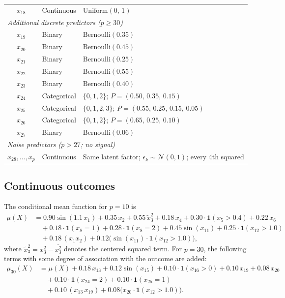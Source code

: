 \documentclass[11pt]{article}
\theoremstyle{plain}
\theoremstyle{definition}
\theoremstyle{remark}
\begin{document}
\begin{table}[ht!]
\begin{tabular}{cll}
		$x_{18}$ & Continuous   & $\mathrm{Uniform}(0,\, 1)$ \\[4pt]
		\multicolumn{3}{l}{\textit{Additional discrete predictors ($p \geq 30$)}} \\[2pt]
		$x_{19}$ & Binary       & $\mathrm{Bernoulli}(0.35)$ \\
		$x_{20}$ & Binary       & $\mathrm{Bernoulli}(0.45)$ \\
		$x_{21}$ & Binary       & $\mathrm{Bernoulli}(0.25)$ \\
		$x_{22}$ & Binary       & $\mathrm{Bernoulli}(0.55)$ \\
		$x_{23}$ & Binary       & $\mathrm{Bernoulli}(0.40)$ \\
		$x_{24}$ & Categorical  & $\{0,1,2\}$;\; $P = (0.50,\, 0.35,\, 0.15)$ \\
		$x_{25}$ & Categorical  & $\{0,1,2,3\}$;\; $P = (0.55,\, 0.25,\, 0.15,\, 0.05)$ \\
		$x_{26}$ & Categorical  & $\{0,1,2\}$;\; $P = (0.65,\, 0.25,\, 0.10)$ \\
		$x_{27}$ & Binary       & $\mathrm{Bernoulli}(0.06)$ \\[4pt]
		\multicolumn{3}{l}{\textit{Noise predictors ($p > 27$; no signal)}} \\[2pt]
		$x_{28}, \ldots, x_p$ & Continuous & Same latent factor; $\epsilon_k \sim \mathcal{N}(0,1)$; every 4th squared \\
		\hline
	\end{tabular}
\end{table}

\subsection*{Continuous outcomes}

The conditional mean function for $p = 10$ is
\begin{align*}
	\mu(X) &= 0.90\sin(1.1\,x_1) + 0.35\,x_2 + 0.55\,\tilde{x}_3^2 + 0.18\,x_4 + 0.30\cdot\mathbf{1}(x_5 > 0.4) + 0.22\,x_6 \\
	&\quad + 0.18\cdot\mathbf{1}(x_8{=}1) + 0.28\cdot\mathbf{1}(x_8{=}2) + 0.45\sin(x_{11}) + 0.25\cdot\mathbf{1}(x_{12} > 1.0) \\
	&\quad + 0.18\,(x_1 x_2) + 0.12\bigl(\sin(x_{11})\cdot\mathbf{1}(x_{12} > 1.0)\bigr),
\end{align*}
where $\tilde{x}_3^2 = x_3^2 - \overline{x_3^2}$ denotes the centered squared term. For $p = 30$, the following terms with some degree of association with the outcome are added:
\begin{align*}
	\mu_{30}(X) &= \mu(X) + 0.18\,x_{13} + 0.12\sin(x_{15}) + 0.10\cdot\mathbf{1}(x_{16} > 0) + 0.10\,x_{19} + 0.08\,x_{20} \\
	&\quad + 0.10\cdot\mathbf{1}(x_{24}{=}2) + 0.10\cdot\mathbf{1}(x_{25}{=}1) \\
	&\quad + 0.10\,(x_{13}\,x_{19}) + 0.08\bigl(x_{20}\cdot\mathbf{1}(x_{12} > 1.0)\bigr).
\end{align*}
\end{document}
